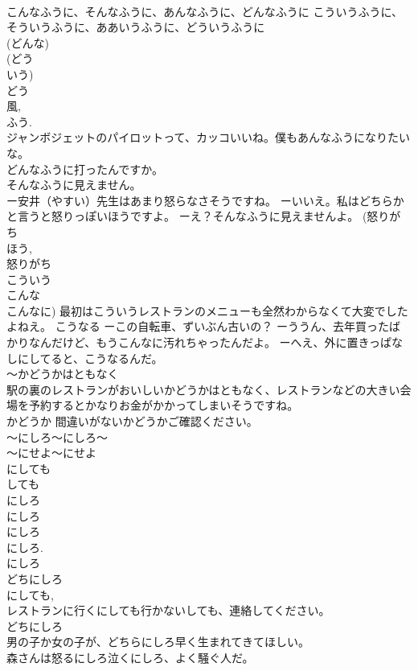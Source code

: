 \documentclass[8pt]{extreport}
\begin{document}
\begin{CJK}{UTF8}{min}
\\	こんなふうに、そんなふうに、あんなふうに、どんなふうに こういうふうに、そういうふうに、ああいうふうに、どういうふうに	
\\	(どんな) 
\\	(どう
\\	いう) 
\\	どう
\\	風, 
\\	ふう. 
\\	ジャンボジェットのパイロットって、カッコいいね。僕もあんなふうになりたいな。 
\\	どんなふうに打ったんですか。 
\\	そんなふうに見えません。 
\\	ー安井（やすい）先生はあまり怒らなさそうですね。 ーいいえ。私はどちらかと言うと怒りっぽいほうですよ。 ーえ？そんなふうに見えませんよ。 (怒りがち 
\\	ほう, 
\\	怒りがち 
\\	こういう
\\	こんな 
\\	こんなに) 最初はこういうレストランのメニューも全然わからなくて大変でしたよねえ。 こうなる ーこの自転車、ずいぶん古いの？ ーううん、去年買ったばかりなんだけど、もうこんなに汚れちゃったんだよ。 ーへえ、外に置きっぱなしにしてると、こうなるんだ。
\\	～かどうかはともなく	
\\	駅の裏のレストランがおいしいかどうかはともなく、レストランなどの大きい会場を予約するとかなりお金がかかってしまいそうですね。 
\\	かどうか 間違いがないかどうかご確認ください。
\\	～にしろ～にしろ～ 
\\	～にせよ～にせよ 
\\	にしても 
\\	しても 
\\	にしろ
\\	にしろ 
\\	にしろ
\\	にしろ. 
\\	にしろ 
\\	どちにしろ 
\\	にしても, 
\\	レストランに行くにしても行かないしても、連絡してください。 
\\	どちにしろ 
\\	男の子か女の子が、どちらにしろ早く生まれてきてほしい。 
\\	森さんは怒るにしろ泣くにしろ、よく騒ぐ人だ。 

\end{CJK}
\end{document}
